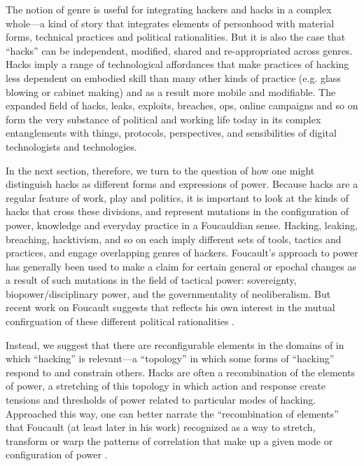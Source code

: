 \documentclass[10pt,letter,oneside]{scrartcl}
\begin{document}
The notion of genre is useful for integrating hackers and hacks in a complex
whole---a kind of story that integrates elements of personhood with material
forms, technical practices and political rationalities.  But it is also the case
that ``hacks'' can be independent, modified, shared and re-appropriated across
genres.  Hacks imply a range of technological affordances that make practices of
hacking less dependent on embodied skill than many other kinds of practice
(e.g. glass blowing or cabinet making) and as a result more mobile and
modifiable.  The expanded field of hacks, leaks, exploits, breaches, ops, online
campaigns and so on form the very substance of political and working life today
in its complex entanglements with things, protocols, perspectives, and
sensibilities of digital technologists and technologies.

In the next section, therefore, we turn to the question of how one might
distinguish hacks as different forms and expressions of power.  Because hacks
are a regular feature of work, play and politics, it is important to look at the
kinds of hacks that cross these divisions, and represent mutations in the
configuration of power, knowledge and everyday practice in a Foucauldian sense.
Hacking, leaking, breaching, hacktivism, and so on each imply different sets of
tools, tactics and practices, and engage overlapping genres of hackers.
Foucault's approach to power has generally been used to make a claim for certain
general or epochal changes as a result of such mutations in the field of
tactical power: sovereignty, biopower/disciplinary power, and the
governmentality of neoliberalism.  But recent work on Foucault suggests that
reflects his own interest in the mutual confirguation of these different
political rationalities \autocite{Macmillan2011a}.

Instead, we suggest that there are reconfigurable elements in the domains of in
which ``hacking'' is relevant---a ``topology'' in which some forms of
``hacking'' respond to and constrain others.  Hacks are often a recombination of
the elements of power, a stretching of this topology in which action and
response create tensions and thresholds of power related to particular modes of
hacking.  Approached this way, one can better narrate the ``recombination of
elements'' that Foucault (at least later in his work) recognized as a way to
stretch, transform or warp the patterns of correlation that make up a given
mode or configuration of power \autocite{Collier2009a}.
\end{document}
